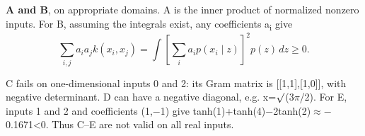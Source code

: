 \textbf{A and B}, on appropriate domains. A is the inner product of normalized nonzero inputs. For B, assuming the integrals exist, any coefficients a\textsubscript{i} give
\[
\sum_{i,j}a_i a_j k(x_i,x_j)
=\int\left[\sum_i a_i p(x_i\mid z)\right]^2p(z)\,dz\ge0.
\]


C fails on one-dimensional inputs 0 and 2: its Gram matrix is [[1,1],[1,0]], with negative determinant. D can have a negative diagonal, e.g. x=\ensuremath{\sqrt{\vphantom{x}}}(3\ensuremath{\pi}/2). For E, inputs 1 and 2 and coefficients (1,\ensuremath{-}1) give tanh(1)+tanh(4)\ensuremath{-}2tanh(2)\ensuremath{\approx}\ensuremath{-}0.1671<0. Thus C–E are not valid on all real inputs.
